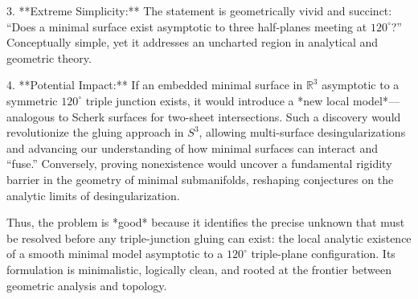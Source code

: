 3. **Extreme Simplicity:**  
The statement is geometrically vivid and succinct: “Does a minimal surface exist asymptotic to three half-planes meeting at $120^\circ$?” Conceptually simple, yet it addresses an uncharted region in analytical and geometric theory.  

4. **Potential Impact:**  
If an embedded minimal surface in $\mathbb{R}^3$ asymptotic to a symmetric $120^\circ$ triple junction exists, it would introduce a *new local model*—analogous to Scherk surfaces for two-sheet intersections. Such a discovery would revolutionize the gluing approach in $S^3$, allowing multi-surface desingularizations and advancing our understanding of how minimal surfaces can interact and “fuse.” Conversely, proving nonexistence would uncover a fundamental rigidity barrier in the geometry of minimal submanifolds, reshaping conjectures on the analytic limits of desingularization.  

Thus, the problem is *good* because it identifies the precise unknown that must be resolved before any triple-junction gluing can exist: the local analytic existence of a smooth minimal model asymptotic to a $120^\circ$ triple-plane configuration. Its formulation is minimalistic, logically clean, and rooted at the frontier between geometric analysis and topology.
